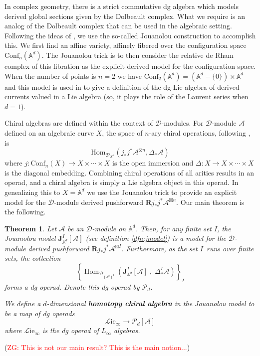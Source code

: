 \documentclass[11pt]{amsart}
\newtheorem*{thm*}{Theorem}
\theoremstyle{definition}
\theoremstyle{remark}
\numberwithin{equation}{section}
\newcommand{\op}{\operatorname}
\newcommand{\Gui}[1]{(\textcolor{red}{ZG: #1})}
\begin{document}
In complex geometry, there is a strict commutative dg algebra which models derived global sections given by the Dolbeault
complex.
What we require is an analog of the Dolbeault complex that can be used in the algebraic setting.
Following the ideas of \cite{FHK}, we use the so-called Jouanolou construction to accomplish this.
We first find an affine variety, affinely fibered over the configuration space $\mathrm{Conf}_n(\mathbb{A}^d)$.
The Jouanolou trick is to then consider the relative de Rham complex of this fibration as the explicit derived model
for the configuration space.
When the number of points is $n=2$ we have $\mathrm{Conf}_2(\mathbb{A}^d) = (\mathbb{A}^d - \{0\})\times \mathbb{A}^d$ and this model is used in \cite{FHK} to give a definition of the dg Lie algebra of
derived currents valued in a Lie algebra (so, it plays the role of the Laurent series when $d=1$).

Chiral algebras are defined within the context of $\mathcal{D}$-modules.
For $\mathcal{D}$-module $\mathcal{A}$ defined on an algebraic curve $X$, the space of $n$-ary chiral operations, following \cite{BD}, is
\begin{equation}\label{}
  \mathrm{Hom}_{\mathcal{D}_{X^{n}}}\left(j_{*}j^*\mathcal{A}^{\boxtimes{n}},\Delta_* \mathcal{A}\right)
\end{equation}
where $j \colon \mathrm{Conf}_n(X) \to X \times \cdots \times X$ is the open immersion and $\Delta \colon X \to X \times
\cdots \times X$ is the diagonal embedding.
Combining chiral operations of all arities results in an operad, and a chiral algebra is simply a Lie algebra object in
this operad.
In genealizing this to $X = \mathbb{A}^d$ we use the Jouanolou trick to provide an explicit model for the $\mathcal{D}
$-module derived pushforward $\mathbf{R} j_* j^* \mathcal{A}^{\boxtimes n}$.
Our main theorem is the following.

\begin{thm*}
  Let $\mathcal{A}$ be an $\mathcal{D}$-module on $\mathbb{A}^d$.
  Then, for any finite set $I$, the Jouanolou model $\mathbf{J}_{\mathbb{A}^d}^I[\mathcal{A}]$ (see definition
  \ref{dfn:jmodel}) is a model for the $\mathcal{D}$-module derived pushforward $\mathbf{R} j_* j^* \mathcal{A}
  ^{\boxtimes I}$.
  Furthermore, as the set $I$~runs over finite sets, the collection
  \begin{equation}\label{}
    \left\{\op{Hom}_{\mathcal{D}_{(\mathbb{A}^{d})^I}} \left(\mathbf{J}^I_{\mathbb{A}^d} [\mathcal{A}] \; ,
    \; \Delta_*^I \mathcal{A} \right) \right\}_{I}
  \end{equation}
  forms a dg operad.
  Denote this dg operad by $\mathcal{P}_d$.

  We define a $d$-dimensional \textit{\textbf{homotopy chiral algebra}} in the Jouanolou
model to be a map of dg operads
  \begin{equation}\label{}
  \mathcal{L} \mathrm{ie}_\infty \to \mathcal{P}_d [\mathcal{A}]
  \end{equation}
  where $\mathcal{L}\mathrm{ie}_\infty$ is the dg operad of $L_\infty$ algebras.
\end{thm*}
\Gui{This is not our main result? This is the main notion...}
\end{document}
